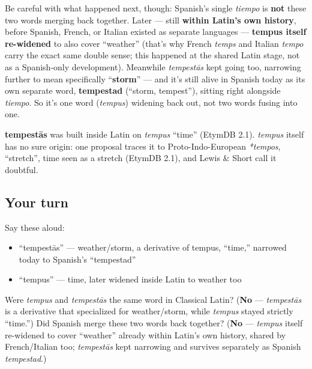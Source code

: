 Be careful with what happened next, though: Spanish's single \emph{tiempo} is \textbf{not} these two words merging back together. Later — still \textbf{within Latin's own history}, before Spanish, French, or Italian existed as separate languages — \textbf{tempus itself re-widened} to also cover \textquotedblleft{}weather\textquotedblright{} (that's why French \emph{temps} and Italian \emph{tempo} carry the exact same double sense; this happened at the shared Latin stage, not as a Spanish-only development). Meanwhile \emph{tempestās} kept going too, narrowing further to mean specifically \textquotedblleft{}\textbf{storm}\textquotedblright{} — and it's still alive in Spanish today as its own separate word, \textbf{tempestad} (\textquotedblleft{}storm, tempest\textquotedblright{}), sitting right alongside \emph{tiempo}. So it's one word (\emph{tempus}) widening back out, not two words fusing into one.

\begin{cousinweb}
\textbf{tempestās} was built inside Latin on \emph{tempus} \textquotedblleft{}time\textquotedblright{} (EtymDB 2.1). \emph{tempus} itself has no sure origin: one proposal traces it to Proto-Indo-European \emph{*tempos}, \textquotedblleft{}stretch\textquotedblright{}, time seen as a stretch (EtymDB 2.1), and Lewis \& Short call it doubtful.
\end{cousinweb}

\subsection*{Your turn}
Say these aloud:

\begin{itemize}
\raggedright
  \item \textquotedblleft{}tempestās\textquotedblright{} — weather/storm, a derivative of tempus, \textquotedblleft{}time,\textquotedblright{} narrowed today to Spanish's \textquotedblleft{}tempestad\textquotedblright{}
  \item \textquotedblleft{}tempus\textquotedblright{} — time, later widened inside Latin to weather too
\end{itemize}

\begin{tcolorbox}[breakable,colback=teal!4,colframe=teal!35!black,title={Before you move on}]
Were \emph{tempus} and \emph{tempestās} the same word in Classical Latin? (\textbf{No} — \emph{tempestās} is a derivative that specialized for weather/storm, while \emph{tempus} stayed strictly \textquotedblleft{}time.\textquotedblright{}) Did Spanish merge these two words back together? (\textbf{No} — \emph{tempus} itself re-widened to cover \textquotedblleft{}weather\textquotedblright{} already within Latin's own history, shared by French/Italian too; \emph{tempestās} kept narrowing and survives separately as Spanish \emph{tempestad}.)
\end{tcolorbox}
